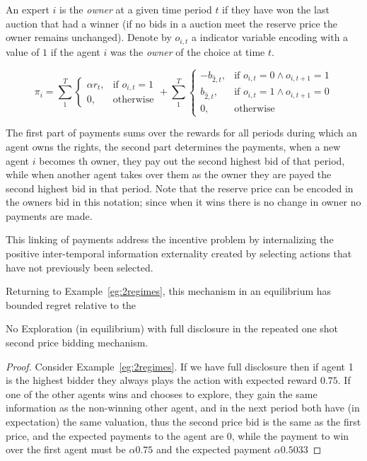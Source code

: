 \begin{mech}

An expert $i$ is the \emph{owner} at a given time period $t$ if they have won the last auction that had a winner (if no bids in a auction meet the reserve price the owner remains unchanged). 
Denote by $o_{i,t}$ a indicator variable encoding with a value of $1$ if the agent $i$ was the \emph{owner} of the choice at time $t$. 

\[
    \pi_i =  \sum_1^T
\begin{cases}
    \alpha r_t ,& \text{if } o_{i,t} = 1\\
    0,              & \text{otherwise}
\end{cases}
+
\sum_1^T
\begin{cases}
     - b_{\hat{2},t} ,& \text{if } o_{i,t} = 0 \land o_{i,t+1} = 1\\
      b_{\hat{2},t} ,& \text{if } o_{i,t}= 1 \land o_{i,t+1} = 0 \\
		0,              & \text{otherwise}
\end{cases}
\]

\end{mech}


The first part of payments sums over the rewards for all periods during which an agent owns the rights, the second part determines the payments, when a new agent $i$ becomes th owner, they pay out the second highest bid of that period, while when another agent takes over them as the owner they are payed the second highest bid in that period. Note that the reserve price can be encoded in the owners bid in this notation; since when it wins there is no change in owner no payments are made. 

This linking of payments address the incentive problem by internalizing the positive inter-temporal information externality created by selecting actions that have not previously been selected.


Returning to Example~\ref{eg:2regimes}, this mechanism in an equilibrium has bounded regret relative to the 

\begin{lem}
No Exploration (in equilibrium) with full disclosure in the repeated one shot second price bidding mechanism.
\end{lem}

\begin{proof}
Consider Example~\ref{eg:2regimes}. If we have full disclosure then if agent 1 is the highest bidder they always plays the action with expected reward $0.75$. If one of the other agents wins and chooses to explore, they gain the same information as the non-winning other agent, and in the next period both have (in expectation) the same valuation, thus the second price bid is the same as the first price, and the expected payments to the agent are 0, while the payment to win over the first agent must be $\alpha 0.75$ and the expected payment $\alpha 0.5033$
\end{proof}

